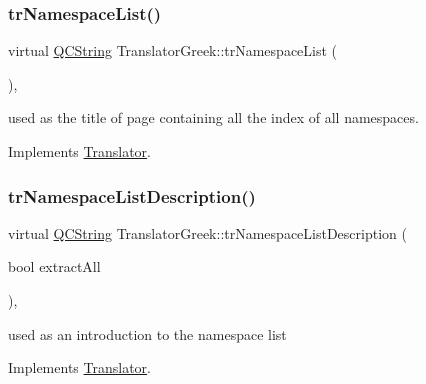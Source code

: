 \mbox{\label{class_translator_greek_ae1333c6af679d9ec5bae803e5d425ba7}} 
\subsubsection{\texorpdfstring{trNamespaceList()}{trNamespaceList()}}
{\footnotesize\ttfamily virtual \mbox{\hyperlink{class_q_c_string}{Q\+C\+String}} Translator\+Greek\+::tr\+Namespace\+List (\begin{DoxyParamCaption}{ }\end{DoxyParamCaption})\hspace{0.3cm}{\ttfamily [inline]}, {\ttfamily [virtual]}}

used as the title of page containing all the index of all namespaces. 

Implements \mbox{\hyperlink{class_translator}{Translator}}.

\mbox{\label{class_translator_greek_a710f99f08eb348480ec387e6d0711b28}} 
\subsubsection{\texorpdfstring{trNamespaceListDescription()}{trNamespaceListDescription()}}
{\footnotesize\ttfamily virtual \mbox{\hyperlink{class_q_c_string}{Q\+C\+String}} Translator\+Greek\+::tr\+Namespace\+List\+Description (\begin{DoxyParamCaption}\item[{bool}]{extract\+All }\end{DoxyParamCaption})\hspace{0.3cm}{\ttfamily [inline]}, {\ttfamily [virtual]}}

used as an introduction to the namespace list 

Implements \mbox{\hyperlink{class_translator}{Translator}}.

\mbox{\label{class_translator_greek_a1db58f872d81040b982f13486375bab3}} 
